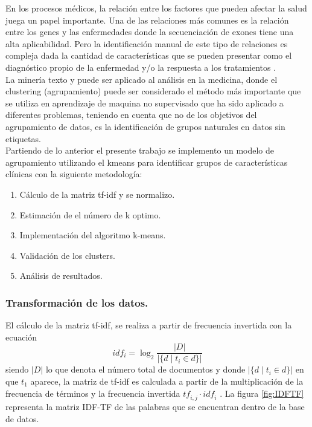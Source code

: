 En los procesos médicos, la relación entre los factores que pueden afectar la salud juega un papel importante. Una de las relaciones más comunes es la relación entre los genes y las enfermedades donde la secuenciación de exones tiene una alta aplicabilidad. Pero la identificación manual de este tipo de relaciones es compleja dada la cantidad de características que se pueden presentar como el diagnóstico propio de la enfermedad y/o la respuesta a los tratamientos \cite{Kawashima2017}.\\

La minería texto y puede ser aplicado al análisis en la medicina, donde el clustering (agrupamiento) puede ser considerado el método más importante que se utiliza en aprendizaje de maquina no supervisado que ha sido aplicado a diferentes problemas\cite{Kawashima2017}, teniendo en cuenta que no de los objetivos del agrupamiento de datos, es la  identificación de grupos naturales en datos sin etiquetas\cite{Jain2010}.\\

Partiendo de lo anterior el presente trabajo se implemento un modelo de agrupamiento utilizando el kmeans  para identificar grupos de características clínicas con la siguiente metodología:

\begin{enumerate}
	\item Cálculo de la matriz tf-idf y se normalizo. 
	\item Estimación de el número de k optimo.
	\item Implementación del algoritmo k-means.
	\item Validación de los clusters.
	\item Análisis de resultados. 	  
\end{enumerate}

\subsubsection{Transformación de los datos.}

El cálculo de la matriz tf-idf, se realiza a partir de frecuencia invertida con la ecuación 
$${idf}_i = \log_2 \frac{|D|}{|\{d \mid t_i \in d\}|}$$
siendo $|D|$ lo que denota el número total de documentos y donde $|\{d\mid t_i \in d\}|$ en  que $t_1$ aparece, la matriz de tf-idf es calculada a partir de la multiplicación de la frecuencia de términos y la frecuencia invertida $\mathit{tf}_{i,j} \cdot \mathit{idf}_i$ \cite{Buckley1988}. 
La figura \ref{fig:IDFTF} representa la matriz IDF-TF de las palabras que se encuentran dentro de la base de datos.  

